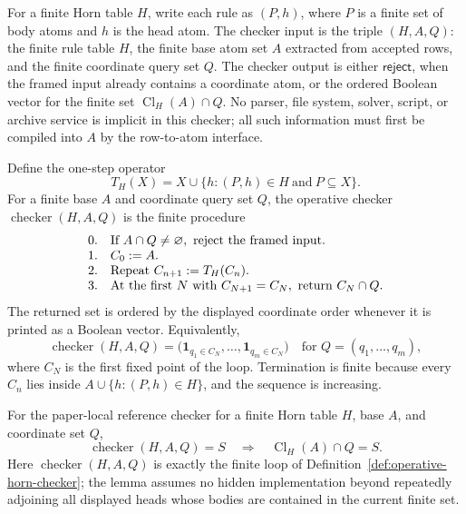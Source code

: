 \documentclass[runningheads]{llncs}
\begin{document}
\begin{definition}
\label{def:operative-horn-checker}
For a finite Horn table \(H\), write each rule as \((P,h)\), where \(P\) is a
finite set of body atoms and \(h\) is the head atom.  The checker input is the
triple \((H,A,Q)\): the finite rule table \(H\), the finite base atom set \(A\)
extracted from accepted rows, and the finite coordinate query set \(Q\).  The
checker output is either \(\mathsf{reject}\), when the framed input already
contains a coordinate atom, or the ordered Boolean vector for the finite set
\(\operatorname{Cl}_{H}(A)\cap Q\).  No parser, file system, solver, script, or
archive service is implicit in this checker; all such information must first be
compiled into \(A\) by the row-to-atom interface.

Define the one-step operator
\[
T_H(X)=X\cup\{h:(P,h)\in H\ \text{and}\ P\subseteq X\}.
\]
For a finite base \(A\) and coordinate query set \(Q\), the operative checker
\(\operatorname{checker}(H,A,Q)\) is the finite procedure
\[
\begin{array}{@{}ll@{}}
0.&\text{If }A\cap Q\ne\varnothing,\text{ reject the framed input.}\\
1.&C_0:=A.\\
2.&\text{Repeat }C_{n+1}:=T_H(C_n).\\
3.&\text{At the first }N\text{ with }C_{N+1}=C_N,\text{ return }C_N\cap Q.
\end{array}
\]
The returned set is ordered by the displayed coordinate order whenever it is
printed as a Boolean vector.  Equivalently,
\[
\operatorname{checker}(H,A,Q)=
\bigl(\mathbf 1_{q_1\in C_N},\ldots,\mathbf 1_{q_m\in C_N}\bigr)
\quad\text{for }Q=(q_1,\ldots,q_m),
\]
where \(C_N\) is the first fixed point of the loop.  Termination is finite
because every \(C_n\) lies inside \(A\cup\{h:(P,h)\in H\}\), and the sequence is
increasing.
\end{definition}

\begin{lemma}
\label{lem:operative-reference-checker-soundness}
For the paper-local reference checker for a finite Horn table \(H\), base
\(A\), and coordinate set \(Q\),
\[
\operatorname{checker}(H,A,Q)=S\quad\Longrightarrow\quad
\operatorname{Cl}_{H}(A)\cap Q=S .
\]
Here \(\operatorname{checker}(H,A,Q)\) is exactly the finite loop of
Definition~\ref{def:operative-horn-checker}; the lemma assumes no hidden
implementation beyond repeatedly adjoining all displayed heads whose bodies are
contained in the current finite set.
\end{lemma}
\end{document}
